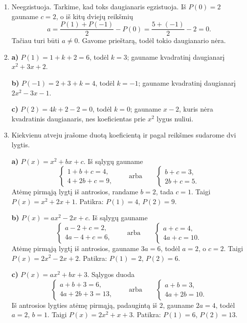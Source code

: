 \documentclass[12pt,a4paper]{exam}
\begin{document}
\begin{enumerate}
\textbf{c)} $c=3$, $b=\frac{6}{2}=3$, $a=\frac{10}{2}-3=2$, todėl $P(x)=2x^2+3x+3$. Patikra: $P(0)=3$, $P(1)=8$, $P(-1)=2$; jų suma $10$, skirtumas $6$.
\item Neegzistuoja. Tarkime, kad toks daugianaris egzistuoja. Iš $P(0)=2$ gauname $c=2$, o iš kitų dviejų reikšmių
\[
a=\frac{P(1)+P(-1)}{2}-P(0)=\frac{5+(-1)}{2}-2=0.
\]
Tačiau turi būti $a\ne0$. Gavome prieštarą, todėl tokio daugianario nėra.
\item

\textbf{a)} $P(1)=1+k+2=6$, todėl $k=3$; gauname kvadratinį daugianarį $x^2+3x+2$.

\textbf{b)} $P(-1)=2+3+k=4$, todėl $k=-1$; gauname kvadratinį daugianarį $2x^2-3x-1$.

\textbf{c)} $P(2)=4k+2-2=0$, todėl $k=0$; gauname $x-2$, kuris nėra kvadratinis daugianaris, nes koeficientas prie $x^2$ lygus nuliui.
\item Kiekvienu atveju įrašome duotą koeficientą ir pagal reikšmes sudarome dvi lygtis.

\textbf{a)} $P(x)=x^2+bx+c$. Iš sąlygų gauname
\[
\begin{cases}1+b+c=4,\\4+2b+c=9,\end{cases}
\qquad\text{arba}\qquad
\begin{cases}b+c=3,\\2b+c=5.\end{cases}
\]
Atėmę pirmąją lygtį iš antrosios, randame $b=2$, tada $c=1$. Taigi $P(x)=x^2+2x+1$. Patikra: $P(1)=4$, $P(2)=9$.

\textbf{b)} $P(x)=ax^2-2x+c$. Iš sąlygų gauname
\[
\begin{cases}a-2+c=2,\\4a-4+c=6,\end{cases}
\qquad\text{arba}\qquad
\begin{cases}a+c=4,\\4a+c=10.\end{cases}
\]
Atėmę pirmąją lygtį iš antrosios, gauname $3a=6$, todėl $a=2$, o $c=2$. Taigi $P(x)=2x^2-2x+2$. Patikra: $P(1)=2$, $P(2)=6$.

\textbf{c)} $P(x)=ax^2+bx+3$. Sąlygos duoda
\[
\begin{cases}a+b+3=6,\\4a+2b+3=13,\end{cases}
\qquad\text{arba}\qquad
\begin{cases}a+b=3,\\4a+2b=10.\end{cases}
\]
Iš antrosios lygties atėmę pirmąją, padaugintą iš $2$, gauname $2a=4$, todėl $a=2$, $b=1$. Taigi $P(x)=2x^2+x+3$. Patikra: $P(1)=6$, $P(2)=13$.


\end{enumerate}
\end{document}
